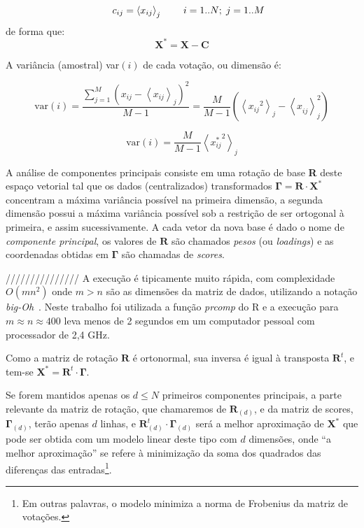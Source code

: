 \documentclass[a4paper, 12pt]{article}
\begin{document}
\[
  \begin{array}{r r r r}
    ~ & c_{ij} = \left< x_{ij} \right>_{j} & ~ & i=1..N;\;j=1..M \\
  \end{array}
\]
de forma que:
\[
  \mathbf{X^{*}} = \mathbf{X} - \mathbf{C}
\]

A variância (amostral) var$(i)$ de cada votação, ou dimensão é:

\[
\mathrm{var}(i) = \frac{\sum_{j=1}^M \left( x_{ij} - \left< x_{ij} \right>_j \right)^2 }{M-1}
= \frac{M}{M-1}\left(\left< {x_{ij}}^{2} \right>_{j} - \left< x_{ij}^{~}\right>_{j}^{2} \right)
\]

\begin{equation}
\mathrm{var}(i) = \frac{M}{M-1}\left<{x_{ij}^{*}}^{2}\right>_{j}
\label{eq:variancia}
\end{equation}

A análise de componentes principais consiste em uma rotação de base \textbf{R} deste espaço vetorial tal que os dados (centralizados) transformados $\mathbf{\Gamma} = \mathbf{R}\cdot \mathbf{X^{*}}$ concentram a máxima variância possível na primeira dimensão, a segunda dimensão possui a máxima variância possível sob a restrição de ser ortogonal à primeira, e assim sucessivamente. A cada vetor da nova base é dado o nome de \emph{componente principal}, os valores de $\mathbf{R}$ são chamados \emph{pesos} (ou \emph{loadings}) e as coordenadas obtidas em $\mathbf{\Gamma}$ são chamadas de \emph{scores}.


///////////////
 A execução é tipicamente muito rápida, com complexidade $O(mn^2)$ onde $m>n$ são as dimensões da matriz de dados, utilizando a notação \emph{big-Oh}~\cite{golub-vanloan}. Neste trabalho foi utilizada a função \emph{prcomp} do R e a execução para $m\approx n \approx 400$ leva menos de 2 segundos em um computador pessoal com processador de 2,4 GHz.

Como a matriz de rotação $\mathbf{R}$ é ortonormal, sua inversa é igual à transposta $\mathbf{R}^{t}$, e tem-se $\mathbf{X^{*}} = \mathbf{R}^t \cdot \mathbf{\Gamma}$.

Se forem mantidos apenas os $d \leq N$ primeiros componentes principais, a parte relevante da matriz de rotação, que chamaremos de $\mathbf{R}_{(d)}$, e da matriz de scores, $\mathbf{\Gamma}_{(d)}$, terão apenas $d$ linhas, e $\mathbf{R}_{(d)}^{t}\cdot \mathbf{\Gamma}_{(d)}$ será a melhor aproximação de $\mathbf{X^{*}}$ que pode ser obtida com um modelo linear deste tipo com $d$ dimensões, onde ``a melhor aproximação'' se refere à minimização da soma dos quadrados das diferenças das entradas\footnote{Em outras palavras, o modelo minimiza a norma de Frobenius da matriz de votações.}.
\end{document}

